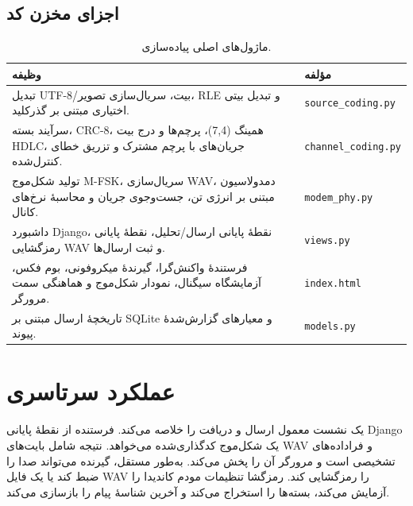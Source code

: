 \documentclass[12pt,a4paper]{article}
\providecommand{\lr}[1]{\foreignlanguage{english}{\begingroup\hyphenchar\font=-1 #1\endgroup}}
\newcommand{\code}[1]{\lr{\texttt{#1}}}
\begin{document}
\subsection{اجزای مخزن کد}
\begin{table}[ht]
\centering
\small
\begin{tabularx}{\textwidth}{@{}Xl@{}}
\toprule
\textbf{وظیفه} & \textbf{مؤلفه} \\
\midrule
تبدیل \lr{UTF-8}/بیت، سریال‌سازی تصویر، \lr{RLE} و تبدیل بیتی اختیاری مبتنی بر گذرکلید. & \code{source\_coding.py} \\
سرآیند بسته، \lr{CRC-8}، همینگ \lr{(7,4)}، پرچم‌ها و درج بیت \lr{HDLC}، جریان‌های با پرچم مشترک و تزریق خطای کنترل‌شده. & \code{channel\_coding.py} \\
تولید شکل‌موج \lr{M-FSK}، سریال‌سازی \lr{WAV}، دمدولاسیون مبتنی بر انرژی تن، جست‌وجوی جریان و محاسبۀ نرخ‌های کانال. & \code{modem\_phy.py} \\
داشبورد \lr{Django}، نقطۀ پایانی ارسال/تحلیل، نقطۀ پایانی رمزگشایی \lr{WAV} و ثبت ارسال‌ها. & \code{views.py} \\
فرستندۀ واکنش‌گرا، گیرندۀ میکروفونی، بوم فکس، آزمایشگاه سیگنال، نمودار شکل‌موج و هماهنگی سمت مرورگر. & \code{index.html} \\
تاریخچۀ ارسال مبتنی بر \lr{SQLite} و معیارهای گزارش‌شدۀ پیوند. & \code{models.py} \\
\bottomrule
\end{tabularx}
\caption{ماژول‌های اصلی پیاده‌سازی.}
\label{tab:modules}
\end{table}

\section{عملکرد سرتاسری}
\label{sec:operation}

 یک نشست معمول ارسال و دریافت را خلاصه می‌کند. فرستنده از نقطۀ پایانی \lr{Django} یک شکل‌موج کدگذاری‌شده می‌خواهد. نتیجه شامل بایت‌های \lr{WAV} و فراداده‌های تشخیصی است و مرورگر آن را پخش می‌کند. به‌طور مستقل، گیرنده می‌تواند صدا را ضبط کند یا یک فایل \lr{WAV} را رمزگشایی کند. رمزگشا تنظیمات مودم کاندیدا را آزمایش می‌کند، بسته‌ها را استخراج می‌کند و آخرین شناسۀ پیام را بازسازی می‌کند.
\end{document}
